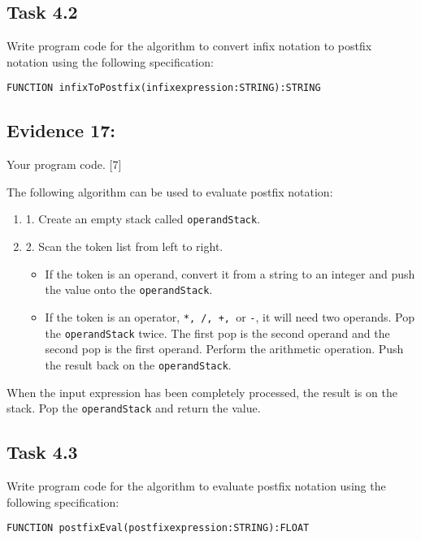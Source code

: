 \subsection*{Task 4.2 }

Write program code for the algorithm to convert infix notation to
postfix notation using the following specification: 
\noindent \begin{center}
\texttt{FUNCTION infixToPostfix(infixexpression:STRING):STRING}
\par\end{center}

\subsection*{Evidence 17: }

Your program code. \hfill{}{[}7{]}

The following algorithm can be used to evaluate postfix notation: 
\begin{enumerate}
\item 1. Create an empty stack called \texttt{operandStack}. 
\item 2. Scan the token list from left to right. 
\begin{itemize}
\item If the token is an operand, convert it from a string to an integer
and push the value onto the \texttt{operandStack}. 
\item If the token is an operator, \texttt{{*}, /, +, }or \texttt{-}, it
will need two operands. Pop the \texttt{operandStack} twice. The first
pop is the second operand and the second pop is the first operand.
Perform the arithmetic operation. Push the result back on the \texttt{operandStack}.
\end{itemize}
\end{enumerate}
When the input expression has been completely processed, the result
is on the stack. Pop the \texttt{operandStack} and return the value.

\subsection*{Task 4.3 }

Write program code for the algorithm to evaluate postfix notation
using the following specification: 
\noindent \begin{center}
\texttt{FUNCTION postfixEval(postfixexpression:STRING):FLOAT }
\par\end{center}

